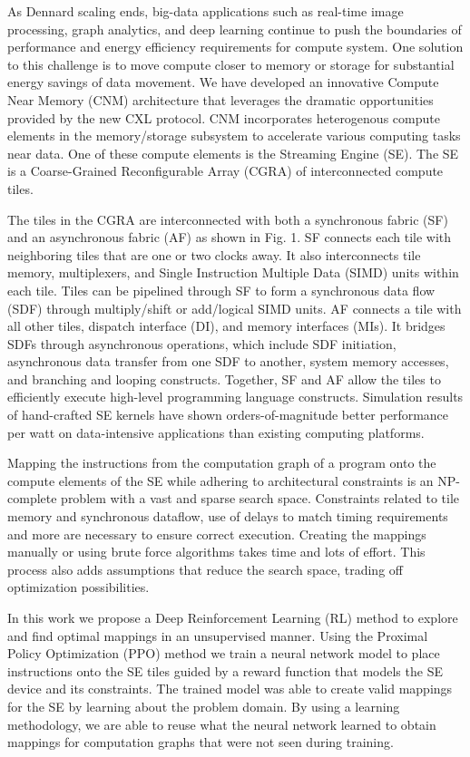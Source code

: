 As Dennard scaling ends, big-data applications such as real-time image processing, graph analytics, and deep learning continue to push the boundaries of performance and energy efficiency requirements for compute system. 
One solution to this challenge is to move compute closer to memory or storage for substantial energy savings of data movement. 
We have developed an innovative Compute Near Memory (CNM) architecture that leverages the dramatic opportunities provided by the new CXL protocol. 
CNM incorporates heterogenous compute elements in the memory/storage subsystem to accelerate various computing tasks near data. 
One of these compute elements is the Streaming Engine (SE). The SE is a Coarse-Grained Reconfigurable Array (CGRA) of interconnected compute tiles.  

The tiles in the CGRA are interconnected with both a synchronous fabric (SF) and an asynchronous fabric (AF) as shown in Fig. 1. SF connects each tile with neighboring tiles that are one or two clocks away. 
It also interconnects tile memory, multiplexers, and Single Instruction Multiple Data (SIMD) units within each tile. 
Tiles can be pipelined through SF to form a synchronous data flow (SDF) through multiply/shift or add/logical SIMD units. 
AF connects a tile with all other tiles, dispatch interface (DI), and memory interfaces (MIs). 
It bridges SDFs through asynchronous operations, which include SDF initiation, asynchronous data transfer from one SDF to another, system memory accesses, and branching and looping constructs. 
Together, SF and AF allow the tiles to efficiently execute high-level programming language constructs. 
Simulation results of hand-crafted SE kernels have shown orders-of-magnitude better performance per watt on data-intensive applications than existing computing platforms.

Mapping the instructions from the computation graph of a program onto the compute elements of the SE while adhering to architectural constraints is an NP-complete problem with a vast and sparse search space. 
Constraints related to tile memory and synchronous dataflow, use of delays to match timing requirements and more are necessary to ensure correct execution. 
Creating the mappings manually or using brute force algorithms takes time and lots of effort. 
This process also adds assumptions that reduce the search space, trading off optimization possibilities.  

In this work we propose a Deep Reinforcement Learning (RL) method to explore and find optimal mappings in an unsupervised manner. 
Using the Proximal Policy Optimization (PPO) method we train a neural network model to place instructions onto the SE tiles guided by a reward function that models the SE device and its constraints. 
The trained model was able to create valid mappings for the SE by learning about the problem domain. 
By using a learning methodology, we are able to reuse what the neural network learned to obtain mappings for computation graphs that were not seen during training.  


